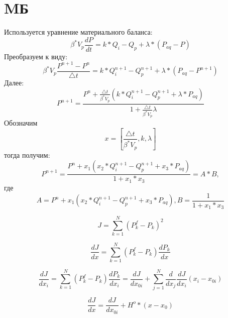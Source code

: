 \documentclass[14pt]{article}
\begin{document}
	\section{MБ}
	Используется уравнение материального баланса:
	\begin{equation} \label{fil}
		\beta^*V_p\frac{dP}{dt} = k*Q_i-Q_p+\lambda*(P_{aq} - P) 
	\end{equation}
Преобразуем к виду:
	\begin{equation} \label{fil}
		\beta^*V_p\frac{P^{n+1}-P^n}{\triangle t} = k*Q_i^{n+1}-Q_p^{n+1}+\lambda*(P_{aq} - P^{n+1}) 
	\end{equation}
	Далее:
	\begin{equation} \label{mape}
		P^{n+1} = \frac{P^n + \frac{\triangle t}{\beta^*V_p}	\left(k*Q_i^{n+1}-Q_p^{n+1}+\lambda*P_{aq} \right)}{1+\frac{\triangle t}{\beta^*V_p}\lambda}
	\end{equation}
	Обозначим
	\begin{equation} \label{mape}
		x = \left[\frac{\triangle t}{\beta^*V_p}, k,\lambda\right]
	\end{equation}
	тогда получим:
	\begin{equation} \label{mape}
		P^{n+1} = \frac{P^n + x_1\left(x_2*Q_i^{n+1}-Q_p^{n+1}+x_3*P_{aq} \right)}{1+x_1*x_3} = A*B,
	\end{equation}
	где
	\begin{equation} \label{mape}
		A = P^n + x_1\left(x_2*Q_i^{n+1}-Q_p^{n+1}+x_3*P_{aq} \right),
		B = \frac{1}{1+x_1*x_3}
	\end{equation}


	\begin{equation} \label{lf}
		J = \sum_{k=1}^N{\left(P_k^f - P_k\right)^2}
	\end{equation}

	\begin{equation} \label{mape}
		\frac{dJ}{dx} = \sum_{k=1}^N{\left(P_k^f - P_k\right)\frac{dP_k}{dx}}
	\end{equation}

	\begin{equation} \label{mape}
		\frac{dJ}{dx_i} = \sum_{k=1}^N{\left(P_k^f - P_k\right)\frac{dP_k}{dx_i}}  = \frac{dJ}{dx_{0 i}} + \sum_{j=1}^{N}\frac{d}{dx_j}\frac{dJ}{dx_i}\left(x_i-x_{0 i}\right)
	\end{equation}

	\begin{equation} \label{mape}
		\frac{dJ}{dx} = \frac{dJ}{dx_{0 i}} + H^o*(x-x_0)
	\end{equation}
	
\end{document}
